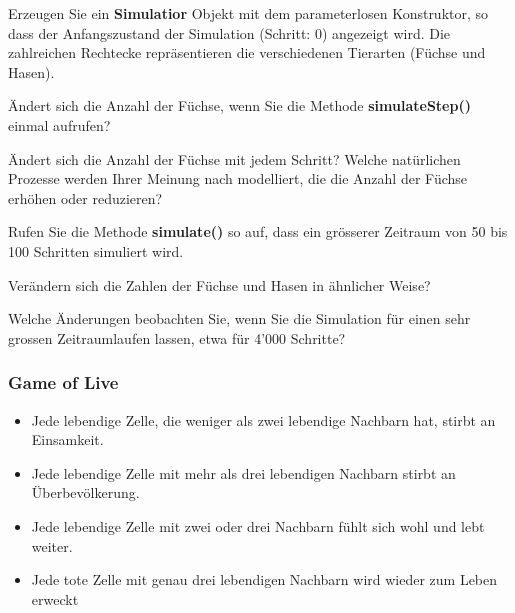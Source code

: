 \begin{Exercise}[%
title={Verstehen der Simulation},
label={ex:simulation}]

    \begin{ExePart}
        Erzeugen Sie ein \textbf{Simulatior} Objekt mit dem parameterlosen
        Konstruktor, so dass der Anfangszustand der Simulation
        (Schritt: 0) angezeigt wird. Die zahlreichen Rechtecke repräsentieren
        die verschiedenen Tierarten (Füchse und Hasen).

        Ändert sich die Anzahl der Füchse, wenn Sie die Methode
        \textbf{simulateStep()} einmal aufrufen?
    \end{ExePart}


    \begin{ExePart}
        Ändert sich die Anzahl der Füchse mit jedem Schritt? Welche natürlichen
        Prozesse werden Ihrer Meinung nach modelliert, die die Anzahl der Füchse
        erhöhen oder reduzieren?
    \end{ExePart}


    \begin{ExePart}
        Rufen Sie die Methode \textbf{simulate()} so auf, dass ein grösserer
        Zeitraum von 50 bis 100 Schritten simuliert wird.

        Verändern sich die Zahlen der Füchse und Hasen in ähnlicher Weise?
    \end{ExePart}


    \begin{ExePart}
        Welche Änderungen beobachten Sie, wenn Sie die Simulation für einen sehr
        grossen Zeitraumlaufen lassen, etwa für 4'000 Schritte?
    \end{ExePart}

\end{Exercise}

\begin{frame}[fragile]
  \frametitle<presentation>{Game of Live}

    \begin{itemize}
        \item Jede lebendige Zelle, die weniger als zwei lebendige Nachbarn hat,
            stirbt an Einsamkeit.
        \item Jede lebendige Zelle mit mehr als drei lebendigen Nachbarn stirbt
            an Überbevölkerung.
        \item Jede lebendige Zelle mit zwei oder drei Nachbarn fühlt sich wohl und lebt weiter.
        \item Jede tote Zelle mit genau drei lebendigen Nachbarn wird wieder zum Leben erweckt
    \end{itemize}

\end{frame}
